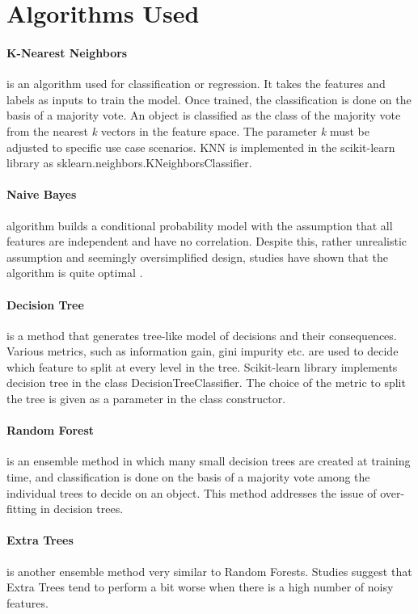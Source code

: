 \section{Algorithms Used}

\paragraph{K-Nearest Neighbors} is an algorithm used for classification or regression. It takes the features and labels as inputs to train the model. Once trained, the classification is done on the basis of a majority vote. An object is classified as the class of the majority vote from the nearest \textit{k} vectors in the feature space. The parameter \textit{k} must be adjusted to specific use case scenarios. KNN is implemented in the scikit-learn library \cite{scikit-learn} as sklearn.neighbors.KNeighborsClassifier.

\paragraph{Naive Bayes} algorithm builds a conditional probability model with the assumption that all features are independent and have no correlation. Despite this, rather unrealistic assumption and seemingly oversimplified design, studies have shown that the algorithm is quite optimal \cite{nb_optimal}.

\paragraph{Decision Tree} is a method that generates tree-like model of decisions and their consequences. Various metrics, such as information gain, gini impurity etc. are used to decide which feature to split at every level in the tree. Scikit-learn library \cite{scikit-learn} implements decision tree in the class DecisionTreeClassifier. The choice of the metric to split the tree is given as a parameter in the class constructor.

\paragraph{Random Forest} \cite{random_forest} is an ensemble method in which many small decision trees are created at training time, and classification is done on the basis of a majority vote among the individual trees to decide on an object. This method addresses the issue of over-fitting in decision trees.

\paragraph{Extra Trees} is another ensemble method very similar to Random Forests. Studies suggest \cite{extra_tree} that Extra Trees tend to perform a bit worse when there is a high number of noisy features.
